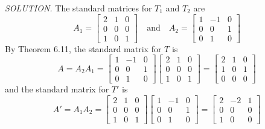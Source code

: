 \documentclass{article}
\begin{document}
    \textit{\textcolor{blue5}{SOLUTION.}} The standard matrices for $T_1$ and $T_2$ are
    \[A_1 = \begin{bmatrix}
        2 & 1 & 0 \\
        0 & 0 & 0\\
        1 & 0 & 1
    \end{bmatrix} \quad 
    \text{and} \quad
    A_2 = \begin{bmatrix}
        1 & -1 & 0 \\
        0 & 0 & 1 \\
        0 & 1 & 0
    \end{bmatrix}\]
    By Theorem 6.11, the standard matrix for $T$ is
    \[A = A_2A_1 = \begin{bmatrix}
        1 & -1 & 0 \\
        0 & 0 & 1 \\
        0 & 1 & 0
    \end{bmatrix} \begin{bmatrix}
        2 & 1 & 0 \\
        0 & 0 & 0\\
        1 & 0 & 1
    \end{bmatrix} = \begin{bmatrix}
        2 & 1 & 0 \\
        1 & 0 & 1 \\
        0 & 0 & 0
    \end{bmatrix} \]
    and the standard matrix for $T'$ is
    \[A' = A_1A_2 = \begin{bmatrix}
        2 & 1 & 0 \\
        0 & 0 & 0\\
        1 & 0 & 1
    \end{bmatrix} \begin{bmatrix}
        1 & -1 & 0 \\
        0 & 0 & 1 \\
        0 & 1 & 0
    \end{bmatrix} = \begin{bmatrix}
        2 & -2 & 1 \\
        0 & 0 & 0\\
        1 & 0 & 0
    \end{bmatrix}\]
    
\end{document}
